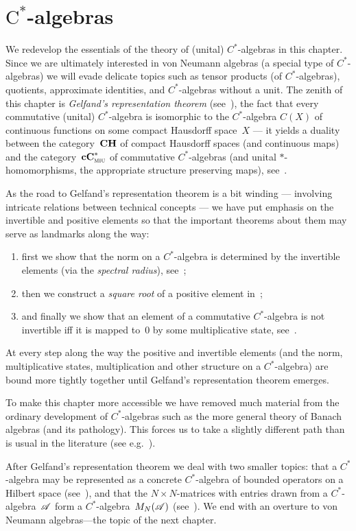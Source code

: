 \documentclass[a]{subfiles}
\begin{document}
\chapter{$\text{C}^*$-algebras}
\begin{parsec}
\begin{point}
We redevelop the essentials of the theory of (unital) $C^*$-algebras
in this chapter.
Since we are ultimately interested
in von Neumann algebras
(a special type of $C^*$-algebras)
we will evade
delicate
topics such as tensor products (of $C^*$-algebras), 
quotients, approximate identities,
and $C^*$-algebras without a unit.
The zenith of this chapter
is \emph{Gelfand's representation theorem} (see~),
the fact that every commutative (unital) $C^*$-algebra
is isomorphic
to the $C^*$-algebra
$C(X)$ of continuous functions on some compact Hausdorff space~$X$
--- it yields a duality
	between the category~$\mathbf{CH}$
	of compact Hausdorff spaces (and continuous maps)
and the category~$\mathbf{cC}^*_{\text{\textsc{miu}}}$ of commutative $C^*$-algebras (and
unital $*$-homomorphisms,
the appropriate structure preserving maps), see~.

As the road to Gelfand's representation theorem 
is a bit winding ---
involving intricate relations between technical concepts --- 
we have put emphasis on the invertible and  positive elements
so that the important
theorems about them may serve as landmarks along the way:
\begin{enumerate}
\item
first we show that the norm
on a $C^*$-algebra
is determined by the invertible elements
(via the \emph{spectral radius}), see~;

\item
then we construct a \emph{square root} of a positive element in~;

\item
and finally we
show that an element of a commutative $C^*$-algebra
is not invertible iff it is mapped to~$0$
by some multiplicative state, see~.
\end{enumerate}
At every step along the way
the positive and invertible elements 
(and the norm, multiplicative states, multiplication
and other structure on a $C^*$-algebra)
are bound more tightly together
until Gelfand's representation theorem emerges.

To make this chapter
more accessible
we have removed
much material
from the ordinary development
of $C^*$-algebras
such as the more general theory of Banach algebras
(and its pathology).
This forces us
to take a slightly different path than is usual in the literature 
(see e.g.~).

After Gelfand's representation theorem
we deal with two smaller topics:
that a $C^*$-algebra
may be represented as a concrete $C^*$-algebra
of bounded operators on a Hilbert space (see~),
and that the $N\times N$-matrices with entries drawn from a 
$C^*$-algebra~$\mathscr{A}$
form a $C^*$-algebra~$M_N(\mathscr{A})$
(see~).
We end
with an overture to von Neumann algebras---the
topic of the next chapter.
\end{point}%
\end{parsec}
\end{document}
